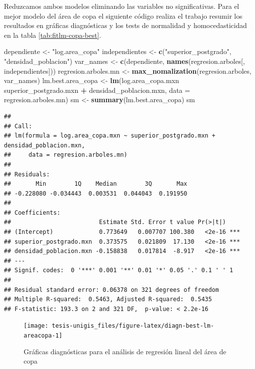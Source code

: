 \documentclass[12pt,]{book}
\newenvironment{Shaded}{\begin{snugshade}}{\end{snugshade}}
\newcommand{\KeywordTok}[1]{\textcolor[rgb]{0.13,0.29,0.53}{\textbf{#1}}}
\newcommand{\DataTypeTok}[1]{\textcolor[rgb]{0.13,0.29,0.53}{#1}}
\newcommand{\StringTok}[1]{\textcolor[rgb]{0.31,0.60,0.02}{#1}}
\newcommand{\OperatorTok}[1]{\textcolor[rgb]{0.81,0.36,0.00}{\textbf{#1}}}
\newcommand{\NormalTok}[1]{#1}
\begin{document}
Reduzcamos ambos modelos eliminando las variables no significativas.
Para el mejor modelo del área de copa el siguiente código realiza el
trabajo resumir los resultados en gráficas diagnósticas y los tests de
normalidad y homocedasticidad en la tabla \ref{tab:fitlm-copa-best}.

\begin{Shaded}
\begin{Highlighting}[]
\NormalTok{dependiente <-}\StringTok{ "log.area_copa"}
\NormalTok{independientes <-}\StringTok{ }\KeywordTok{c}\NormalTok{(}\StringTok{"superior_postgrado"}\NormalTok{, }\StringTok{"densidad_poblacion"}\NormalTok{)}
\NormalTok{var_names <-}\StringTok{ }\KeywordTok{c}\NormalTok{(dependiente, }\KeywordTok{names}\NormalTok{(regresion.arboles[, independientes]))}
\NormalTok{regresion.arboles.mn <-}\StringTok{ }\KeywordTok{max_nomalization}\NormalTok{(regresion.arboles, var_names)}
\NormalTok{lm.best.area_copa <-}\StringTok{ }\KeywordTok{lm}\NormalTok{(log.area_copa.mxn }\OperatorTok{~}\StringTok{ }\NormalTok{superior_postgrado.mxn }\OperatorTok{+}\StringTok{ }\NormalTok{densidad_poblacion.mxn, }
    \DataTypeTok{data =}\NormalTok{ regresion.arboles.mn)}
\NormalTok{sm <-}\StringTok{ }\KeywordTok{summary}\NormalTok{(lm.best.area_copa)}
\NormalTok{sm}
\end{Highlighting}
\end{Shaded}

\begin{verbatim}
## 
## Call:
## lm(formula = log.area_copa.mxn ~ superior_postgrado.mxn + densidad_poblacion.mxn, 
##     data = regresion.arboles.mn)
## 
## Residuals:
##       Min        1Q    Median        3Q       Max 
## -0.228080 -0.034443  0.003531  0.044043  0.191950 
## 
## Coefficients:
##                         Estimate Std. Error t value Pr(>|t|)    
## (Intercept)             0.773649   0.007707 100.380   <2e-16 ***
## superior_postgrado.mxn  0.373575   0.021809  17.130   <2e-16 ***
## densidad_poblacion.mxn -0.158838   0.017814  -8.917   <2e-16 ***
## ---
## Signif. codes:  0 '***' 0.001 '**' 0.01 '*' 0.05 '.' 0.1 ' ' 1
## 
## Residual standard error: 0.06378 on 321 degrees of freedom
## Multiple R-squared:  0.5463, Adjusted R-squared:  0.5435 
## F-statistic: 193.3 on 2 and 321 DF,  p-value: < 2.2e-16
\end{verbatim}

\begin{figure}
\texttt{[image: tesis-unigis\_files/figure-latex/diagn-best-lm-areacopa-1]} \caption{Gráficas diagnósticas para el análisis de regresión lineal del área de copa}\label{fig:diagn-best-lm-areacopa}
\end{figure}
\end{document}
